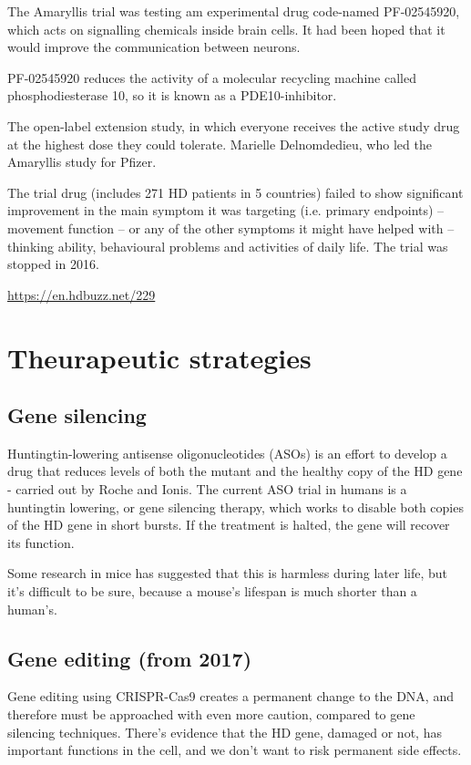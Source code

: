 The Amaryllis trial was testing am experimental drug code-named PF-02545920,
which acts on signalling chemicals inside brain cells. It had been hoped that it
would improve the communication between neurons.

PF-02545920 reduces the activity of a molecular recycling machine called
phosphodiesterase 10, so it is known as a PDE10-inhibitor.

The open-label extension study, in which everyone receives the active study drug
at the highest dose they could tolerate.
Marielle Delnomdedieu, who led the Amaryllis study for Pfizer.

The trial drug (includes 271 HD patients in 5 countries) failed to show
significant improvement in the main symptom it was targeting (i.e. primary
endpoints) – movement function – or any of the other symptoms it might have
helped with – thinking ability, behavioural problems and activities of daily
life. The trial was stopped in 2016.



\url{https://en.hdbuzz.net/229}

\section{Theurapeutic strategies}

\subsection{Gene silencing}

Huntingtin-lowering antisense oligonucleotides (ASOs) is an effort to develop a
drug that reduces levels of both the mutant and the healthy copy of the HD gene
- carried out by Roche and Ionis. The current ASO trial in humans is a
huntingtin lowering, or gene silencing therapy, which works to disable both
copies of the HD gene in short bursts. If the treatment is halted, the gene will
recover its function.
 
Some research in mice has suggested that this is harmless during later life, 
but it's difficult to be sure, because a mouse's lifespan is much shorter than
a human's. 



\subsection{Gene editing (from 2017)}

Gene editing using CRISPR-Cas9 creates a permanent change to the DNA, and
therefore must be approached with even more caution, compared to gene silencing
techniques. 
There's evidence that the HD gene, damaged or not, has important functions in
the cell, and we don't want to risk permanent side effects.

